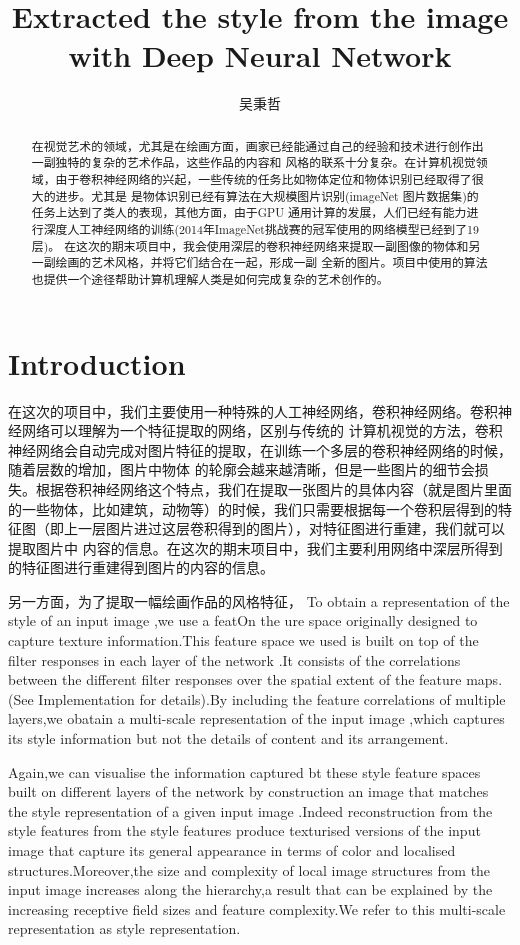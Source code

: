 \documentclass[10pt,a4paper]{ctexart}
\author{吴秉哲}
\title{Extracted the style from the image\\with Deep Neural Network}
\begin{document}
	\maketitle
	\begin{abstract}
		在视觉艺术的领域，尤其是在绘画方面，画家已经能通过自己的经验和技术进行创作出一副独特的复杂的艺术作品，这些作品的内容和
        风格的联系十分复杂。在计算机视觉领域，由于卷积神经网络的兴起，一些传统的任务比如物体定位和物体识别已经取得了很大的进步。尤其是
        是物体识别已经有算法在大规模图片识别(imageNet 图片数据集)的任务上达到了类人的表现\cite{Krizhevsky2012ImageNet}，其他方面，由于GPU
        通用计算\cite{Deng2012Large}的发展，人们已经有能力进行深度人工神经网络的训练(2014年ImageNet挑战赛的冠军使用的网络模型已经到了19层)。
        在这次的期末项目中，我会使用深层的卷积神经网络来提取一副图像的物体和另一副绘画的艺术风格，并将它们结合在一起，形成一副
        全新的图片。项目中使用的算法也提供一个途径帮助计算机理解人类是如何完成复杂的艺术创作的。
	\end{abstract}
	\section{Introduction}
	在这次的项目中，我们主要使用一种特殊的人工神经网络，卷积神经网络。卷积神经网络可以理解为一个特征提取的网络，区别与传统的
    计算机视觉的方法，卷积神经网络会自动完成对图片特征的提取，在训练一个多层的卷积神经网络的时候，随着层数的增加，图片中物体
    的轮廓会越来越清晰，但是一些图片的细节会损失。根据卷积神经网络这个特点，我们在提取一张图片的具体内容（就是图片里面的一些物体，比如建筑，动物等）的时候，我们只需要根据每一个卷积层得到的特征图（即上一层图片进过这层卷积得到的图片），对特征图进行重建，我们就可以提取图片中
    内容的信息。在这次的期末项目中，我们主要利用网络中深层所得到的特征图进行重建得到图片的内容的信息。
	
    另一方面，为了提取一幅绘画作品的风格特征，
    To obtain a representation of the style of an input image ,we use a featOn the ure
	space originally designed to capture texture information.This feature space we used is built on top of the filter responses in each layer of the network
	.It consists of the correlations between the different filter responses over the spatial extent of the feature maps.(See Implementation for details).By including the feature correlations of multiple layers,we obatain a multi-scale representation of the input image ,which captures its style information but not the details of content and its arrangement.
	
	Again,we can visualise the information captured bt these style feature spaces built on different layers of the network by construction an image that matches the style representation of a given input image .Indeed reconstruction from the style features from the style features produce 
	texturised versions of the input image that capture its general appearance in 
	terms of color and localised structures.Moreover,the size and complexity of local image structures from the input image increases along the hierarchy,a result that can be explained by the increasing receptive field sizes and feature complexity.We refer to this multi-scale representation as style representation.
	
\end{document}
